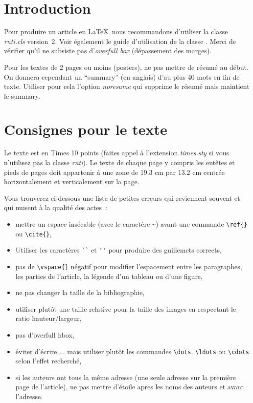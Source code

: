 \documentclass[a4paper,french]{rnti}
\affiliation{
    \affil{1}Adresse postale complète\\
          adresse@email,\\
          \http{http://www.une-page.html}\\
    \affil{2}Autre adresse\\
          autre-adresse@email\\
          \http{http://www.une-autre-page.html}\\
    \affil{3}Encore une autre adresse\\
          encore-une-autre-adresse@email
 }
\begin{document}

%
\section{Introduction}

Pour produire un article en \LaTeX\ nous recommandons d'utiliser la
classe \textit{rnti.cls} version~2. Voir également le guide
d'utilisation de la classe \citep{ritschard:2005rnti}. Merci de
vérifier qu'il ne subsiste pas d'\emph{overfull box} (dépassement
des marges).

Pour les textes de 2 pages ou moins (posters), ne pas mettre de
résumé au début. On donnera cependant un ``summary'' (en anglais)
d'au plus 40 mots en fin de texte. Utiliser pour cela l'option
\textit{noresume} qui supprime le résumé mais maintient le summary.

\section{Consignes pour le texte}


Le texte est en Times 10 points (faites appel à l'extension
\textit{times.sty} si vous n'utilisez pas la classe \textit{rnti}).
Le texte de chaque page y compris les entêtes et pieds de pages doit
appartenir à une zone de 19.3 cm par 13.2 cm centrée horizontalement
et verticalement sur la page.

Vous trouverez ci-dessous une liste de petites erreurs qui reviennent souvent et qui nuisent à la qualité des actes~:
\begin{itemize}
\item mettre un espace insécable (avec le caractère \verb+~+) avant une commande \verb+\ref{}+ ou   \verb+\cite{}+,
\item  Utiliser les caractères  \verb+``+ et \verb+''+ pour produire des guillemets  corrects,
\item pas de \verb+\vspace{}+ négatif pour modifier l'espacement entre les paragraphes, les 
parties de l'article, la légende d'un tableau ou d'une figure, 
\item ne pas changer la taille de la bibliographie,
\item utiliser plutôt une taille relative pour la taille des images en respectant 
le ratio hauteur/largeur,
\item pas d'overfull hbox,
\item éviter d'écrire ... mais utiliser plutôt les commandes \verb+\dots+, \verb+\ldots+  ou \verb+\cdots+ selon l'effet recherché,
\item si les auteurs ont tous la même adresse (une seule adresse sur la première page de l'article), ne pas mettre d'étoile apres les noms des auteurs et avant l'adresse.
\end{itemize}
\end{document}
